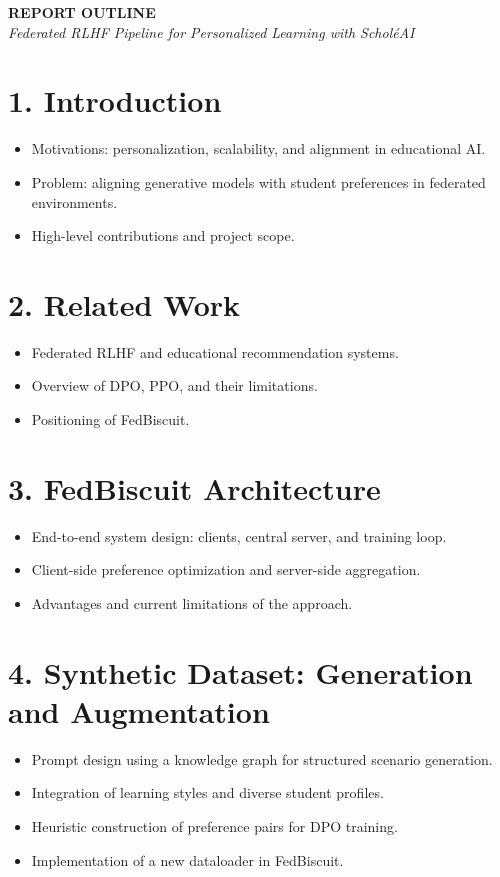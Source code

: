 \documentclass[headsepline,footsepline,footinclude=false,oneside,fontsize=10pt,paper=a4]{scrbook}
\begin{document}

\begin{center}
    \LARGE \textbf{REPORT OUTLINE} \\[0.5cm]
    \normalsize \textit{Federated RLHF Pipeline for Personalized Learning with ScholéAI}
\end{center}

\vspace{1.5cm}

\section*{1. Introduction}
\begin{itemize}[leftmargin=1.5em]
    \item Motivations: personalization, scalability, and alignment in educational AI.
    \item Problem: aligning generative models with student preferences in federated environments.
    \item High-level contributions and project scope.
\end{itemize}

\section*{2. Related Work}
\begin{itemize}[leftmargin=1.5em]
    \item Federated RLHF and educational recommendation systems.
    \item Overview of DPO, PPO, and their limitations.
    \item Positioning of FedBiscuit.
\end{itemize}

\section*{3. FedBiscuit Architecture}
\begin{itemize}[leftmargin=1.5em]
    \item End-to-end system design: clients, central server, and training loop.
    \item Client-side preference optimization and server-side aggregation.
    \item Advantages and current limitations of the approach.
\end{itemize}

\section*{4. Synthetic Dataset: Generation and Augmentation}
\begin{itemize}[leftmargin=1.5em]
    \item Prompt design using a knowledge graph for structured scenario generation.
    \item Integration of learning styles and diverse student profiles.
    \item Heuristic construction of preference pairs for DPO training.
    \item Implementation of a new dataloader in FedBiscuit.
\end{itemize}
\end{document}
